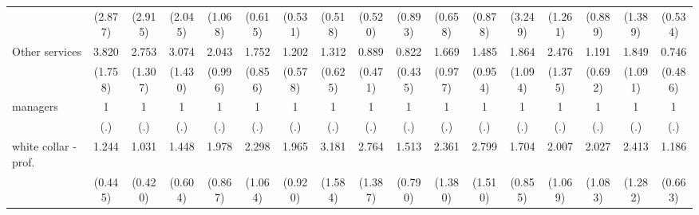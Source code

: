 {\begin{tabular}{l*{16}{c}}
                    &     (2.877)         &     (2.915)         &     (2.045)         &     (1.068)         &     (0.615)         &     (0.531)         &     (0.518)         &     (0.520)         &     (0.893)         &     (0.658)         &     (0.878)         &     (3.249)         &     (1.261)         &     (0.889)         &     (1.389)         &     (0.534)         \\
[1em]
Other services      &       3.820\sym{**} &       2.753\sym{*}  &       3.074\sym{*}  &       2.043         &       1.752         &       1.202         &       1.312         &       0.889         &       0.822         &       1.669         &       1.485         &       1.864         &       2.476         &       1.191         &       1.849         &       0.746         \\
                    &     (1.758)         &     (1.307)         &     (1.430)         &     (0.996)         &     (0.856)         &     (0.578)         &     (0.625)         &     (0.471)         &     (0.435)         &     (0.977)         &     (0.954)         &     (1.094)         &     (1.375)         &     (0.692)         &     (1.091)         &     (0.486)         \\
[1em]
managers            &           1         &           1         &           1         &           1         &           1         &           1         &           1         &           1         &           1         &           1         &           1         &           1         &           1         &           1         &           1         &           1         \\
                    &         (.)         &         (.)         &         (.)         &         (.)         &         (.)         &         (.)         &         (.)         &         (.)         &         (.)         &         (.)         &         (.)         &         (.)         &         (.)         &         (.)         &         (.)         &         (.)         \\
[1em]
white collar - prof.&       1.244         &       1.031         &       1.448         &       1.978         &       2.298         &       1.965         &       3.181\sym{*}  &       2.764\sym{*}  &       1.513         &       2.361         &       2.799         &       1.704         &       2.007         &       2.027         &       2.413         &       1.186         \\
                    &     (0.445)         &     (0.420)         &     (0.604)         &     (0.867)         &     (1.064)         &     (0.920)         &     (1.584)         &     (1.387)         &     (0.790)         &     (1.380)         &     (1.510)         &     (0.855)         &     (1.069)         &     (1.083)         &     (1.282)         &     (0.663)         \\

\end{tabular}}
